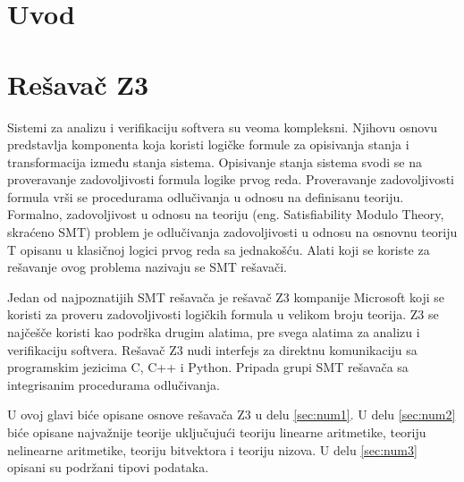\documentclass[12pt,oneside]{memoir}
\begin{document}
\frontmatter
\naslovna
\komisija
\apstrakt
\tableofcontents*

\mainmatter

\chapter{Uvod}


\chapter{Rešavač Z3}
\label{chp:razrada}

Sistemi za analizu i verifikaciju softvera su veoma kompleksni. Njihovu osnovu predstavlja komponenta koja koristi logičke formule za opisivanja stanja i transformacija između stanja sistema. Opisivanje stanja sistema svodi se na proveravanje zadovoljivosti formula logike prvog reda. Proveravanje zadovoljivosti formula vrši se procedurama odlučivanja u odnosu na definisanu teoriju. Formalno, zadovoljivost u odnosu na teoriju (eng. Satisfiability Modulo Theory, skraćeno SMT) problem je odlučivanja zadovoljivosti u odnosu na osnovnu teoriju T opisanu u klasičnoj logici prvog reda sa jednakošću. Alati koji se koriste za rešavanje ovog problema nazivaju se SMT rešavači. 
\par

Jedan od najpoznatijih SMT rešavača je rešavač Z3 kompanije Microsoft koji se koristi za proveru zadovoljivosti logičkih formula u velikom broju teorija. Z3 se najčešče koristi kao podrška drugim alatima, pre svega alatima za analizu i verifikaciju softvera. Rešavač Z3 nudi interfejs za direktnu komunikaciju sa programskim jezicima C, C++ i Python\cite{Barrett}. Pripada grupi SMT rešavača sa integrisanim procedurama odlučivanja.
\par
U ovoj glavi biće opisane osnove rešavača Z3 u delu \ref{sec:num1}. U delu \ref{sec:num2} biće opisane najvažnije teorije uključujući teoriju linearne aritmetike, teoriju nelinearne aritmetike, teoriju bitvektora i teoriju nizova. U delu \ref{sec:num3} opisani su podržani tipovi podataka.  
\end{document}
